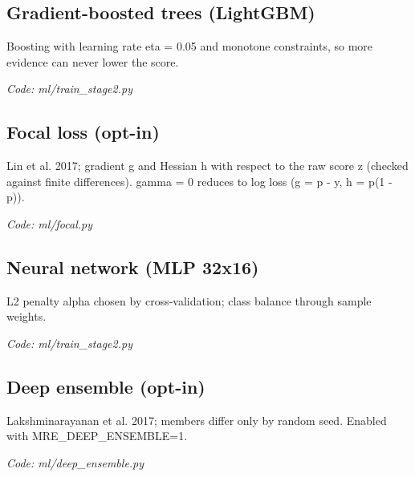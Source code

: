 \documentclass[11pt,a4paper]{article}
\newcommand{\where}[1]{\par{\small\itshape\color{mute}Code: #1}\par}
\begin{document}
\subsection*{Gradient-boosted trees (LightGBM)}
\par\smallskip\noindent{}\par\smallskip
Boosting with learning rate eta = 0.05 and monotone constraints, so more evidence can never lower the score.
\where{ml/train\_stage2.py}

\subsection*{Focal loss (opt-in)}
\par\smallskip\noindent{}\par\smallskip
\par\smallskip\noindent{}\par\smallskip
\par\smallskip\noindent{}\par\smallskip
Lin et al. 2017; gradient g and Hessian h with respect to the raw score z (checked against finite differences). gamma = 0 reduces to log loss (g = p - y, h = p(1 - p)).
\where{ml/focal.py}

\subsection*{Neural network (MLP 32x16)}
\par\smallskip\noindent{}\par\smallskip
L2 penalty alpha chosen by cross-validation; class balance through sample weights.
\where{ml/train\_stage2.py}

\subsection*{Deep ensemble (opt-in)}
\par\smallskip\noindent{}\par\smallskip
Lakshminarayanan et al. 2017; members differ only by random seed. Enabled with MRE\_DEEP\_ENSEMBLE=1.
\where{ml/deep\_ensemble.py}
\end{document}
